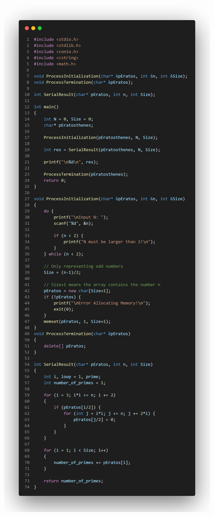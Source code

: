\documentclass[12pt,a4paper]{report}
\begin{document}
\begin{center}
\clearpage
	\includegraphics[trim=0in 0in 0in 28in, clip, scale=0.2]{./Photos/Primes/Serial.PNG}
\end{center}
\end{document}
